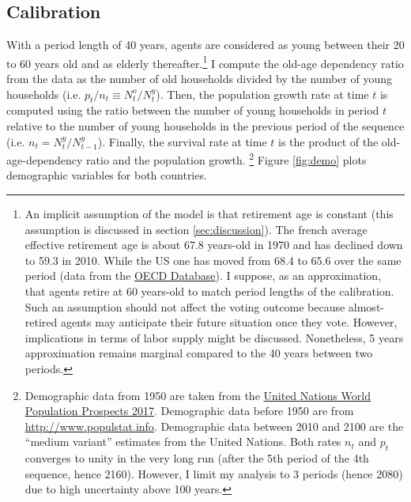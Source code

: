 \subsection{Calibration}\label{subsec:calibration}
With a period length of 40 years, agents are considered as young between their 20 to 60 years old and as elderly thereafter.\footnote{An implicit assumption of the model is that retirement age is constant (this assumption is discussed in section \ref{sec:discussion}). The french average effective retirement age is about 67.8 years-old in 1970 and has declined down to 59.3 in 2010. While the US one has moved from 68.4 to 65.6 over the same period (data from the \href{https://www.oecd.org/els/emp/average-effective-age-of-retirement.htm}{OECD Database}). I suppose, as an approximation, that agents retire at 60 years-old to match period lengths of the calibration. Such an assumption should not affect the voting outcome because almost-retired agents may anticipate their future situation once they vote. However, implications in terms of labor supply might be discussed. Nonetheless, 5 years approximation remains marginal compared to the 40 years between two periods. %
} I compute the old-age dependency ratio from the data as the number of old households divided by the number of young households (i.e. $p_t/n_t \equiv N_t^o/N_t^y$). Then, the population growth rate at time $t$ is computed using the ratio between the number of young households in period $t$ relative to the number of young households in the previous period of the sequence (i.e. $n_t = N_t^y/N_{t-1}^y$). Finally, the survival rate at time $t$ is the product of the old-age-dependency ratio and the population growth.%
\footnote{Demographic data from 1950 are taken from the \href{https://population.un.org/wpp/}{United Nations World Population Prospects 2017}. Demographic data before 1950 are from \href{http://www.populstat.info}{http://www.populstat.info}. Demographic data between 2010 and 2100 are the ``medium variant'' estimates from the United Nations. Both rates $n_t$ and $p_t$ converges to unity in the very long run (after the 5th period of the 4th sequence, hence 2160). However, I limit my analysis to 3 periods (hence 2080) due to high uncertainty above 100 years.} Figure \ref{fig:demo} plots demographic variables for both countries.

